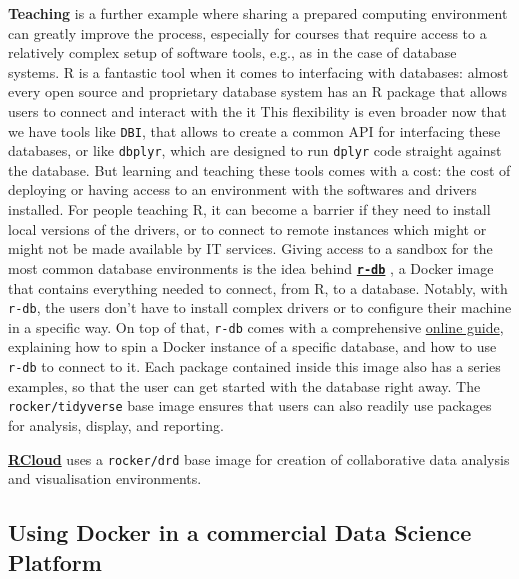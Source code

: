 \textbf{Teaching} is a further example where sharing a prepared
computing environment can greatly improve the process, especially for
courses that require access to a relatively complex setup of software
tools, e.g., as in the case of database systems. R is a fantastic tool
when it comes to interfacing with databases: almost every open source
and proprietary database system has an R package that allows users to
connect and interact with the it This flexibility is even broader now
that we have tools like \texttt{DBI}, that allows to create a common API
for interfacing these databases, or like \texttt{dbplyr}, which are
designed to run \texttt{dplyr} code straight against the database. But
learning and teaching these tools comes with a cost: the cost of
deploying or having access to an environment with the softwares and
drivers installed. For people teaching R, it can become a barrier if
they need to install local versions of the drivers, or to connect to
remote instances which might or might not be made available by IT
services. Giving access to a sandbox for the most common database
environments is the idea behind
\textbf{\href{https://github.com/ColinFay/r-db}{\texttt{r-db}}}
\citep{ColinFay}, a Docker image that contains everything needed to
connect, from R, to a database. Notably, with \texttt{r-db}, the users
don't have to install complex drivers or to configure their machine in a
specific way. On top of that, \texttt{r-db} comes with a comprehensive
\href{http://colinfay.me/r-db/}{online guide}, explaining how to spin a
Docker instance of a specific database, and how to use \texttt{r-db} to
connect to it. Each package contained inside this image also has a
series examples, so that the user can get started with the database
right away. The \texttt{rocker/tidyverse} base image ensures that users
can also readily use packages for analysis, display, and reporting.

\textbf{\href{https://github.com/att/rcloud/tree/master/docker}{RCloud}}
uses a \texttt{rocker/drd} base image for creation of collaborative data
analysis and visualisation environments.

\hypertarget{using-docker-in-a-commercial-data-science-platform}{%
\subsection{Using Docker in a commercial Data Science
Platform}\label{using-docker-in-a-commercial-data-science-platform}}

\label{rstudio}

